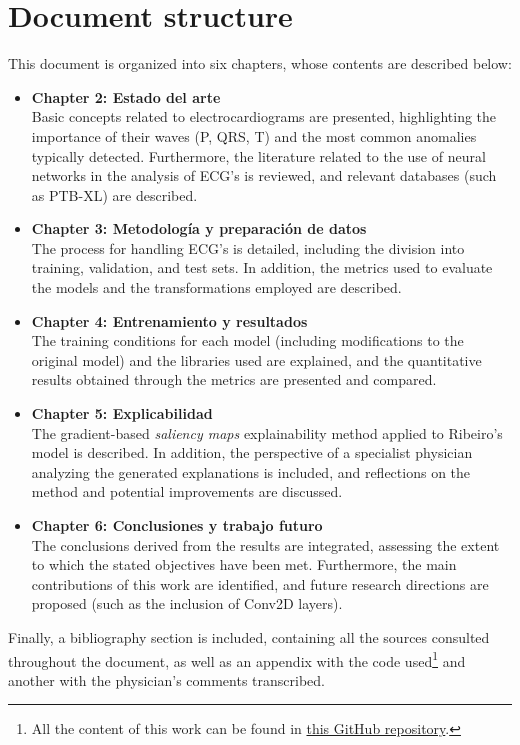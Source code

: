 \section{Document structure}
This document is organized into six chapters, whose contents are described below:
\begin{itemize}
	\item \textbf{Chapter 2: Estado del arte} \\
	Basic concepts related to electrocardiograms are presented, highlighting the importance of their waves (P, QRS, T) and the most common anomalies typically detected. Furthermore, the literature related to the use of neural networks in the analysis of ECG's is reviewed, and relevant databases (such as PTB-XL) are described.
	
	\item  \textbf{Chapter 3: Metodología y preparación de datos} \\
	The process for handling ECG's is detailed, including the division into training, validation, and test sets. In addition, the metrics used to evaluate the models and the transformations employed are described.
	
	\item \textbf{Chapter 4: Entrenamiento y resultados}\\
	The training conditions for each model (including modifications to the original model) and the libraries used are explained, and the quantitative results obtained through the metrics are presented and compared.
	
	\item \textbf{Chapter 5: Explicabilidad}\\
	The gradient-based \emph{saliency maps} explainability method applied to Ribeiro’s model is described. In addition, the perspective of a specialist physician analyzing the generated explanations is included, and reflections on the method and potential improvements are discussed.
	
	\item \textbf{Chapter 6: Conclusiones y trabajo futuro}\\
	The conclusions derived from the results are integrated, assessing the extent to which the stated objectives have been met. Furthermore, the main contributions of this work are identified, and future research directions are proposed (such as the inclusion of Conv2D layers).
\end{itemize}

Finally, a bibliography section is included, containing all the sources consulted throughout the document, as well as an appendix with the code used\footnote{All the content of this work can be found in \href{https://github.com/NotNoe/TFG-Info}{this GitHub repository}.} and another with the physician’s comments transcribed.


